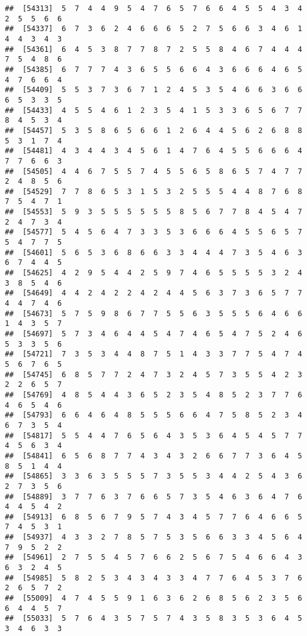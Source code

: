\documentclass[
]{book}
\begin{document}
\begin{verbatim}
##  [54313]  5  7  4  4  9  5  4  7  6  5  7  6  6  4  5  5  4  3  4  2  5  5  6  6
##  [54337]  6  7  3  6  2  4  6  6  6  5  2  7  5  6  6  3  4  6  1  4  4  3  4  3
##  [54361]  6  4  5  3  8  7  7  8  7  2  5  5  8  4  6  7  4  4  4  7  5  4  8  6
##  [54385]  6  7  7  7  4  3  6  5  5  6  6  4  3  6  6  6  4  6  5  4  7  6  6  4
##  [54409]  5  5  3  7  3  6  7  1  2  4  5  3  5  4  6  6  3  6  6  6  5  3  3  5
##  [54433]  4  5  5  4  6  1  2  3  5  4  1  5  3  3  6  5  6  7  7  8  4  5  3  4
##  [54457]  5  3  5  8  6  5  6  6  1  2  6  4  4  5  6  2  6  8  8  5  3  1  7  4
##  [54481]  4  3  4  4  3  4  5  6  1  4  7  6  4  5  5  6  6  6  4  7  7  6  6  3
##  [54505]  4  4  6  7  5  5  7  4  5  5  6  5  8  6  5  7  4  7  7  2  4  8  5  6
##  [54529]  7  7  8  6  5  3  1  5  3  2  5  5  5  4  4  8  7  6  8  7  5  4  7  1
##  [54553]  5  9  3  5  5  5  5  5  5  8  5  6  7  7  8  4  5  4  7  2  4  7  3  4
##  [54577]  5  4  5  6  4  7  3  3  5  3  6  6  6  4  5  5  6  5  7  5  4  7  7  5
##  [54601]  5  6  5  3  6  8  6  6  3  3  4  4  4  7  3  5  4  6  3  6  7  4  4  5
##  [54625]  4  2  9  5  4  4  2  5  9  7  4  6  5  5  5  5  3  2  4  3  8  5  4  6
##  [54649]  4  4  2  4  2  2  4  2  4  4  5  6  3  7  3  6  5  7  7  4  4  7  4  6
##  [54673]  5  7  5  9  8  6  7  7  5  5  6  3  5  5  5  6  4  6  6  1  4  3  5  7
##  [54697]  5  7  3  4  6  4  4  5  4  7  4  6  5  4  7  5  2  4  6  5  3  3  5  6
##  [54721]  7  3  5  3  4  4  8  7  5  1  4  3  3  7  7  5  4  7  4  5  6  7  6  5
##  [54745]  6  8  5  7  7  2  4  7  3  2  4  5  7  3  5  5  4  2  3  2  2  6  5  7
##  [54769]  4  8  5  4  4  3  6  5  2  3  5  4  8  5  2  3  7  7  6  4  6  5  4  6
##  [54793]  6  6  4  6  4  8  5  5  5  6  6  4  7  5  8  5  2  3  4  6  7  3  5  4
##  [54817]  5  5  4  4  7  6  5  6  4  3  5  3  6  4  5  4  5  7  7  4  5  6  3  4
##  [54841]  6  5  6  8  7  7  4  3  4  3  2  6  6  7  7  3  6  4  5  8  5  1  4  4
##  [54865]  3  3  6  3  5  5  5  7  3  5  5  3  4  4  2  5  4  3  6  2  7  3  5  6
##  [54889]  3  7  7  6  3  7  6  6  5  7  3  5  4  6  3  6  4  7  6  4  4  5  4  2
##  [54913]  6  8  5  6  7  9  5  7  4  3  4  5  7  7  6  4  6  6  5  7  4  5  3  1
##  [54937]  4  3  3  2  7  8  5  7  5  3  5  6  6  3  3  4  5  6  4  7  9  5  2  2
##  [54961]  2  7  5  5  4  5  7  6  6  2  5  6  7  5  4  6  6  4  3  6  3  2  4  5
##  [54985]  5  8  2  5  3  4  3  4  3  3  4  7  7  6  4  5  3  7  6  2  6  5  7  2
##  [55009]  4  7  4  5  5  9  1  6  3  6  2  6  8  5  6  2  3  5  6  6  4  4  5  7
##  [55033]  5  7  6  4  3  5  7  5  7  4  3  5  8  3  5  3  6  4  5  3  4  6  3  3

\end{verbatim}
\end{document}
